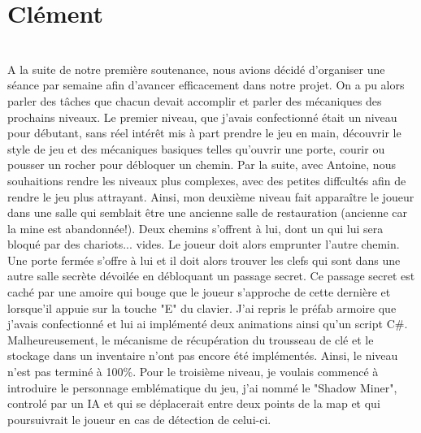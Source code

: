\documentclass[titlepage, 13px, a4paper]{report}
\begin{document}
\paragraph{} \hspace{0pt} \\


\newpage





\section{Clément}
\paragraph{} \hspace{0pt} \\
A la suite de notre première soutenance, nous avions décidé d'organiser une séance par semaine afin d'avancer efficacement dans notre projet.
On a pu alors parler des tâches que chacun devait accomplir et parler des mécaniques des prochains niveaux. 
Le premier niveau, que j'avais confectionné était un niveau pour débutant, sans réel intérêt mis à part prendre le jeu en main,
découvrir le style de jeu et des mécaniques 
basiques telles qu'ouvrir une porte, courir ou pousser un rocher pour débloquer un chemin. 
Par la suite, avec Antoine, nous souhaitions rendre les niveaux plus complexes, avec des petites diffcultés 
afin de rendre le jeu plus attrayant. 
Ainsi, mon deuxième niveau fait apparaître le joueur dans une salle qui semblait être une ancienne salle de restauration 
(ancienne car la mine est abandonnée!). Deux chemins s'offrent à lui, dont un qui lui sera bloqué par des chariots... vides. 
Le joueur doit alors emprunter l'autre chemin. Une porte fermée s'offre à lui et il doit alors trouver les clefs 
qui sont dans une autre salle secrète dévoilée en débloquant un passage secret. Ce passage secret est caché 
par une amoire qui bouge que le joueur s'approche de cette dernière et lorsque'il appuie sur la 
touche "E" du clavier. J'ai repris le préfab armoire que j'avais confectionné et lui ai implémenté deux animations ainsi qu'un script C\#. 
Malheureusement, le mécanisme de récupération du trousseau de clé et le stockage dans un inventaire n'ont pas encore été implémentés. 
Ainsi, le niveau n'est pas terminé à 100\%. 
Pour le troisième niveau, je voulais commencé à introduire le personnage emblématique du jeu, j'ai nommé le "Shadow Miner",
controlé par un IA et qui se déplacerait entre deux points de la map et qui poursuivrait le joueur en cas de détection de celui-ci. 
\end{document}
